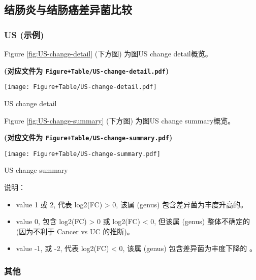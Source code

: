 \documentclass[
]{article}
\providecommand{\tightlist}{%
  \setlength{\itemsep}{0pt}\setlength{\parskip}{0pt}}
\begin{document}
\hypertarget{ux7ed3ux80a0ux708eux4e0eux7ed3ux80a0ux764cux5deeux5f02ux83ccux6bd4ux8f83}{%
\subsection{结肠炎与结肠癌差异菌比较}\label{ux7ed3ux80a0ux708eux4e0eux7ed3ux80a0ux764cux5deeux5f02ux83ccux6bd4ux8f83}}

\hypertarget{assess1}{%
\subsubsection{US (示例)}\label{assess1}}

Figure \ref{fig:US-change-detail} (下方图) 为图US change detail概览。

\textbf{(对应文件为 \texttt{Figure+Table/US-change-detail.pdf})}

\def\@captype{figure}
\begin{center}
\texttt{[image: Figure+Table/US-change-detail.pdf]}
\caption{US change detail}\label{fig:US-change-detail}
\end{center}

Figure \ref{fig:US-change-summary} (下方图) 为图US change summary概览。

\textbf{(对应文件为 \texttt{Figure+Table/US-change-summary.pdf})}

\def\@captype{figure}
\begin{center}
\texttt{[image: Figure+Table/US-change-summary.pdf]}
\caption{US change summary}\label{fig:US-change-summary}
\end{center}

说明：

\begin{itemize}
\tightlist
\item
  value 1 或 2, 代表 log2(FC) \textgreater{} 0, 该属 (genus) 包含差异菌为丰度升高的。
\item
  value 0, 包含 log2(FC) \textgreater{} 0 或 log2(FC) \textless{} 0, 但该属 (genus) 整体不确定的 (因为不利于 Cancer vs UC 的推断)。
\item
  value -1, 或 -2, 代表 log2(FC) \textless{} 0, 该属 (genus) 包含差异菌为丰度下降的 。
\end{itemize}

\hypertarget{assess2}{%
\subsubsection{其他}\label{assess2}}
\end{document}

